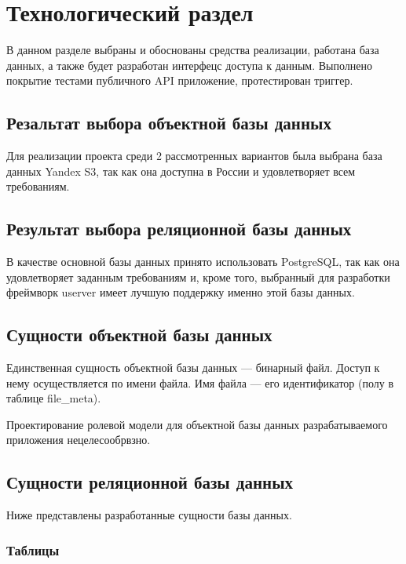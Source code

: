 \section{Технологический раздел} \label{tech}

В данном разделе выбраны и обоснованы средства реализации, работана база данных, а также будет разработан интерфецс доступа к данным. Выполнено покрытие тестами публичного API приложение, протестирован триггер.

\subsection{Резальтат выбора объектной базы данных}

Для реализации проекта среди 2 рассмотренных вариантов была выбрана база данных Yandex S3, так как она доступна в России и удовлетворяет всем требованиям.


\subsection{Результат выбора реляционной базы данных}

В качестве основной базы данных принято использовать PostgreSQL, так как она удовлетворяет заданным требованиям и, кроме того, выбранный для разработки фреймворк userver имеет лучшую поддержку именно этой базы данных.

\subsection{Сущности объектной базы данных}

Единственная сущность объектной базы данных --- бинарный файл. Доступ к нему осуществляется по имени файла. Имя файла --- его идентификатор (полу в таблице file{\_}meta).

Проектирование ролевой модели для объектной базы данных разрабатываемого приложения нецелесообрвзно.

\subsection{Сущности реляционной базы данных}

Ниже представлены разработанные сущности базы данных.

\subsubsection{Таблицы}

